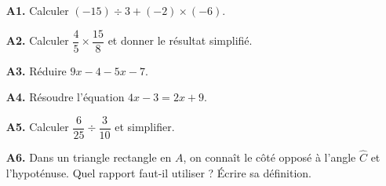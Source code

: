 \documentclass[10pt,a4paper]{article}
\begin{document}
\newpage
{}
\begin{enumerate}
\needspace{22mm}
\item[\textbf{A1.}] Calculer $(-15) \div 3 + (-2)\times(-6)$.
\par\vspace{1.2mm}
\needspace{22mm}
\item[\textbf{A2.}] Calculer $\dfrac{4}{5}\times\dfrac{15}{8}$ et donner le résultat simplifié.
\par\vspace{1.2mm}
\needspace{22mm}
\item[\textbf{A3.}] Réduire $9x - 4 - 5x - 7$.
\par\vspace{1.2mm}
\needspace{22mm}
\item[\textbf{A4.}] Résoudre l'équation $4x - 3 = 2x + 9$.
\par\vspace{1.2mm}
\needspace{22mm}
\item[\textbf{A5.}] Calculer $\dfrac{6}{25}\div\dfrac{3}{10}$ et simplifier.
\par\vspace{1.2mm}
\needspace{22mm}
\item[\textbf{A6.}] Dans un triangle rectangle en $A$, on connaît le côté opposé à l'angle $\widehat{C}$ et l'hypoténuse. Quel rapport faut-il utiliser ? Écrire sa définition.
\par\vspace{1.2mm}
\end{enumerate}
\needspace{68mm}\par\vspace{3mm}
\end{document}
